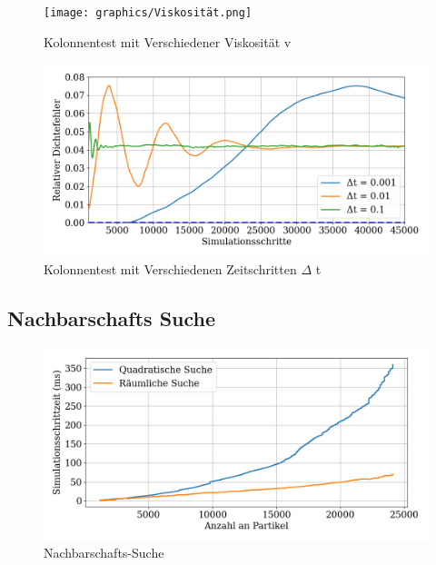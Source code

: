\documentclass[a4paper, 12pt]{article}
\begin{document}
\begin{figure}[H]
	\centering
	\texttt{[image: graphics/Viskosität.png]}
	\caption{Kolonnentest mit Verschiedener Viskosität v}
\end{figure}

\begin{figure}[H]
	\centering
	\includegraphics[width=\textwidth]{graphics/Zeitschritt.png}
	\caption{Kolonnentest mit Verschiedenen Zeitschritten $\Delta$ t}
\end{figure}

\subsection{Nachbarschafts Suche}
\begin{figure}[H]
	\centering
	\includegraphics[width=\textwidth]{graphics/Nachbarschafts-Suche.png}
	\caption{Nachbarschafts-Suche}
\end{figure}
\end{document}
